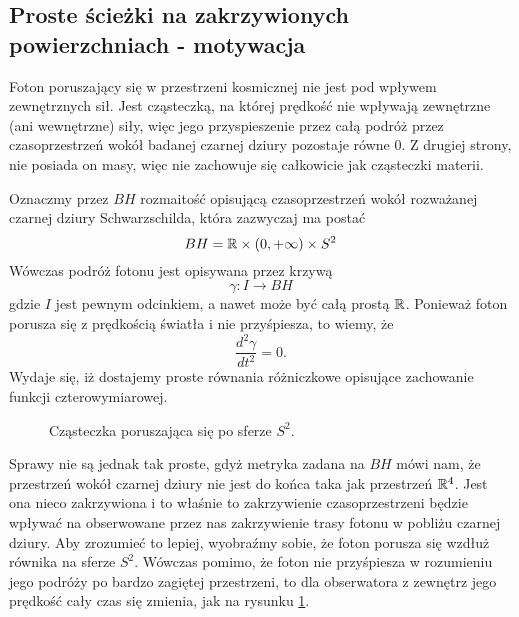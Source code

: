 \subsection{Proste ścieżki na zakrzywionych powierzchniach - motywacja}

Foton poruszający się w przestrzeni kosmicznej nie jest pod wpływem zewnętrznych sił. Jest cząsteczką, na której prędkość nie wpływają zewnętrzne (ani wewnętrzne) siły, więc jego przyspieszenie przez całą podróż przez czasoprzestrzeń wokół badanej czarnej dziury pozostaje równe $0$. Z drugiej strony, nie posiada on masy, więc nie zachowuje się całkowicie jak cząsteczki materii.

Oznaczmy przez $BH$ rozmaitość opisującą czasoprzestrzeń wokół rozważanej czarnej dziury Schwarzschilda, która zazwyczaj ma postać
$$ BH = \mathbb{R} \times (0,+\infty) \times S^2 $$
Wówczas podróż fotonu jest opisywana przez krzywą
$$ \gamma:I \to BH $$
gdzie $I$ jest pewnym odcinkiem, a nawet może być całą prostą $\mathbb{R}$. Ponieważ foton porusza się z prędkością światła i nie przyśpiesza, to wiemy, że 
$$\frac{d^2 \gamma} {d t^2}=0.$$ 
Wydaje się, iż dostajemy proste równania różniczkowe opisujące zachowanie funkcji czterowymiarowej.

\renewcommand{\figurename}{Rysunek}
\begin{figure}[h] 
  \centering 
  \vspace{1cm}
  \caption{Cząsteczka poruszająca się po sferze $S^2$.}\label{czasteczka po sferze}
  \vspace{1cm}
\end{figure}

Sprawy nie są jednak tak proste, gdyż metryka zadana na $BH$ mówi nam, że przestrzeń wokół czarnej dziury nie jest do końca taka jak przestrzeń $\mathbb{R}^4$. Jest ona nieco zakrzywiona i to właśnie to zakrzywienie czasoprzestrzeni będzie wpływać na obserwowane przez nas zakrzywienie trasy fotonu w pobliżu czarnej dziury. Aby zrozumieć to lepiej, wyobraźmy sobie, że foton porusza się wzdłuż równika na sferze $S^2$. Wówczas pomimo, że foton nie przyśpiesza w rozumieniu jego podróży po bardzo zagiętej przestrzeni, to dla obserwatora z zewnętrz jego prędkość cały czas się zmienia, jak na rysunku \ref{czasteczka po sferze}.

